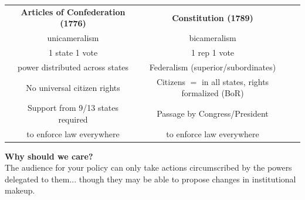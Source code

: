\documentclass[aspectratio=169]{beamer}
\theoremstyle{principle}
\begin{document}
\begin{frame}
\begin{table}[]
\begin{tabular}{cccc}
 & \textbf{Articles of Confederation (1776)} & \textbf{Constitution (1789)} & \\
 &unicameralism&bicameralism& \\
  &1 state 1 vote&1 rep 1 vote&\\
&power distributed across states&Federalism (superior/subordinates)&\\
&No universal citizen rights&Citizens $=$ in all states, rights formalized (BoR)&\\
&Support from 9/13 states required &Passage by Congress/President&\\
&to enforce law everywhere&to enforce law everywhere&
\end{tabular}
\end{table}
\end{frame}

\begin{frame}

\begin{center}
\Huge\textbf{Why should we care?}\\
\bigskip
\bigskip
\large The audience for your policy can only take actions circumscribed by the powers delegated to them... though they may be able to propose changes in institutional makeup.\\
\end{center}

\end{frame}
\end{document}
